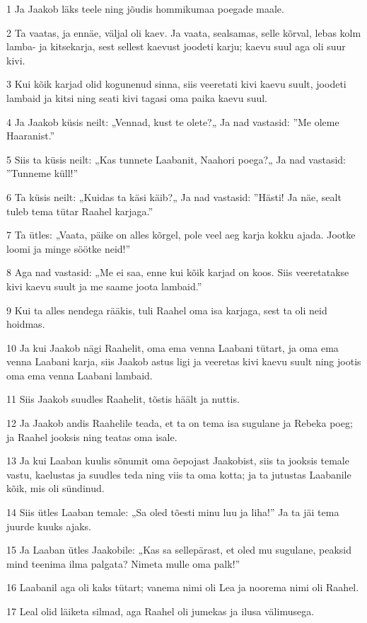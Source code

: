 \par 1 Ja Jaakob läks teele ning jõudis hommikumaa poegade maale.
\par 2 Ta vaatas, ja ennäe, väljal oli kaev. Ja vaata, sealsamas, selle kõrval, lebas kolm lamba- ja kitsekarja, sest sellest kaevust joodeti karju; kaevu suul aga oli suur kivi.
\par 3 Kui kõik karjad olid kogunenud sinna, siis veeretati kivi kaevu suult, joodeti lambaid ja kitsi ning seati kivi tagasi oma paika kaevu suul.
\par 4 Ja Jaakob küsis neilt: „Vennad, kust te olete?„ Ja nad vastasid: ”Me oleme Haaranist.”
\par 5 Siis ta küsis neilt: „Kas tunnete Laabanit, Naahori poega?„ Ja nad vastasid: ”Tunneme küll!”
\par 6 Ta küsis neilt: „Kuidas ta käsi käib?„ Ja nad vastasid: ”Hästi! Ja näe, sealt tuleb tema tütar Raahel karjaga.”
\par 7 Ta ütles: „Vaata, päike on alles kõrgel, pole veel aeg karja kokku ajada. Jootke loomi ja minge söötke neid!”
\par 8 Aga nad vastasid: „Me ei saa, enne kui kõik karjad on koos. Siis veeretatakse kivi kaevu suult ja me saame joota lambaid.”
\par 9 Kui ta alles nendega rääkis, tuli Raahel oma isa karjaga, sest ta oli neid hoidmas.
\par 10 Ja kui Jaakob nägi Raahelit, oma ema venna Laabani tütart, ja oma ema venna Laabani karja, siis Jaakob astus ligi ja veeretas kivi kaevu suult ning jootis oma ema venna Laabani lambaid.
\par 11 Siis Jaakob suudles Raahelit, tõstis häält ja nuttis.
\par 12 Ja Jaakob andis Raahelile teada, et ta on tema isa sugulane ja Rebeka poeg; ja Raahel jooksis ning teatas oma isale.
\par 13 Ja kui Laaban kuulis sõnumit oma õepojast Jaakobist, siis ta jooksis temale vastu, kaelustas ja suudles teda ning viis ta oma kotta; ja ta jutustas Laabanile kõik, mis oli sündinud.
\par 14 Siis ütles Laaban temale: „Sa oled tõesti minu luu ja liha!” Ja ta jäi tema juurde kuuks ajaks.
\par 15 Ja Laaban ütles Jaakobile: „Kas sa sellepärast, et oled mu sugulane, peaksid mind teenima ilma palgata? Nimeta mulle oma palk!”
\par 16 Laabanil aga oli kaks tütart; vanema nimi oli Lea ja noorema nimi oli Raahel.
\par 17 Leal olid läiketa silmad, aga Raahel oli jumekas ja ilusa välimusega.
